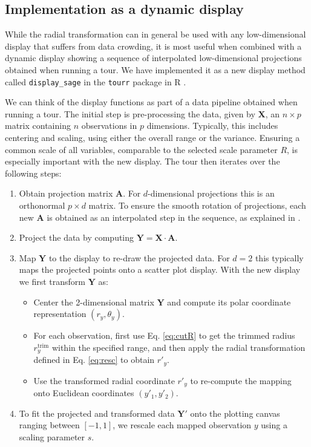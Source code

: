 \documentclass[]{interact}
\theoremstyle{plain}%
\theoremstyle{definition}
\theoremstyle{remark}
\def\tightlist{}
\begin{document}
\hypertarget{sec:implementation}{%
\subsection{Implementation as a dynamic
display}\label{sec:implementation}}

While the radial transformation can in general be used with any
low-dimensional display that suffers from data crowding, it is most
useful when combined with a dynamic display showing a sequence of
interpolated low-dimensional projections obtained when running a tour.
We have implemented it as a new display method called
\texttt{display\_sage} in the \texttt{tourr} package \citep{tourr} in R
\citep{rref}.

We can think of the display functions as part of a data pipeline
obtained when running a tour. The initial step is pre-processing the
data, given by \(\mathbf{X}\), an \(n \times p\) matrix containing \(n\)
observations in \(p\) dimensions. Typically, this includes centering and
scaling, using either the overall range or the variance. Ensuring a
common scale of all variables, comparable to the selected scale
parameter \(R\), is especially important with the new display. The tour
then iterates over the following steps:

\begin{enumerate}
\def\labelenumi{\arabic{enumi}.}
\tightlist
\item
  Obtain projection matrix \(\mathbf{A}\). For \(d\)-dimensional
  projections this is an orthonormal \(p \times d\) matrix. To ensure
  the smooth rotation of projections, each new \(\mathbf{A}\) is
  obtained as an interpolated step in the sequence, as explained in
  \citet{BCAH05}.
\item
  Project the data by computing
  \(\mathbf{Y} = \mathbf{X}\cdot\mathbf{A}\).
\item
  Map \(\mathbf{Y}\) to the display to re-draw the projected data. For
  \(d=2\) this typically maps the projected points onto a scatter plot
  display. With the new display we first transform \(\mathbf{Y}\) as:

  \begin{itemize}
  \tightlist
  \item
    Center the 2-dimensional matrix \(\mathbf{Y}\) and compute its polar
    coordinate representation \((r_y, \theta_y)\).
  \item
    For each observation, first use Eq. \ref{eq:cutR} to get the trimmed
    radius \(r_y^{\mathrm{trim}}\) within the specified range, and then
    apply the radial transformation defined in Eq. \ref{eq:resc} to
    obtain \(r'_y\).
  \item
    Use the transformed radial coordinate \(r'_y\) to re-compute the
    mapping onto Euclidean coordinates \((y'_1, y'_2)\).
  \end{itemize}
\item
  To fit the projected and transformed data \(\mathbf{Y}'\) onto the
  plotting canvas ranging between \([-1,1]\), we rescale each mapped
  observation \(y\) using a scaling parameter \(s\).
\end{enumerate}
\end{document}
